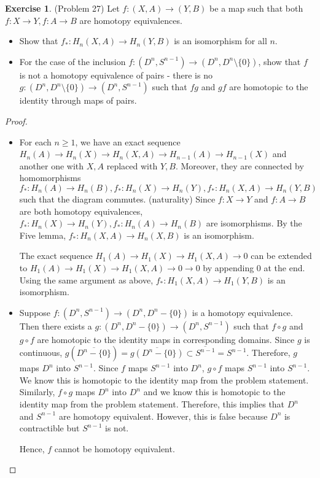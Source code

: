 \documentclass[12pt, psamsfonts]{amsart}
\theoremstyle{definition}
\newtheorem*{exer}{Exercise}
\theoremstyle{remark}
\numberwithin{equation}{section}
\begin{document}
\begin{exer}{(Problem 27)}
  Let $f:(X, A) \rightarrow (Y, B)$ be a map such that both $f: X \rightarrow Y, f:A \rightarrow B$ are homotopy equivalences.

  \begin{itemize}
    \item
      Show that $f_* : H_n(X, A) \rightarrow  H_n(Y, B)$ is an isomorphism for all $n$.
    \item
      For the case of the inclusion $f:(D^n, S^{n - 1}) \rightarrow (D^n, D^n \setminus \{ 0 \})$, show that $f$ is not a homotopy equivalence of pairs -
      there is no $g: (D^n, D^n \setminus \{ 0 \}) \rightarrow (D^n, S^{n - 1})$ such that $fg$ and $gf$ are homotopic to the identity through maps of pairs.
  \end{itemize}
\end{exer}

\begin{proof}
  $ $
  \begin{itemize}
    \item
      For each $n \geq 1$, we have an exact sequence $H_n(A) \rightarrow H_n(X) \rightarrow H_n(X, A) \rightarrow H_{n - 1}(A) \rightarrow H_{n - 1}(X)$ and another one with $X, A$ replaced with $Y, B$.
      Moreover, they are connected by homomorphisms $f_*: H_n(A) \rightarrow H_n(B), f_*: H_n(X) \rightarrow H_n(Y), f_*:H_n(X, A) \rightarrow H_n(Y, B)$ such that the diagram commutes. (naturality)
      Since $f: X \rightarrow Y$ and $f: A \rightarrow B$ are both homotopy equivalences, $f_*: H_n(X) \rightarrow H_n(Y), f_*: H_n(A) \rightarrow H_n(B)$ are isomorphisms.
      By the Five lemma, $f_*: H_n(X, A) \rightarrow H_n(X, B)$ is an isomorphism.

      The exact sequence $H_1(A) \rightarrow H_1(X) \rightarrow H_1(X, A) \rightarrow 0$ can be extended to $H_1(A) \rightarrow H_1(X) \rightarrow H_1(X, A) \rightarrow 0 \rightarrow 0$ by appending 0 at the end.
      Using the same argument as above, $f_*: H_1(X, A) \rightarrow H_1(Y, B)$ is an isomorphism.
    \item
      Suppose $f: (D^n, S^{n - 1}) \rightarrow (D^n, D^n - \{ 0 \})$ is a homotopy equivalence.
      Then there exists a $g: (D^n, D^n - \{ 0 \}) \rightarrow (D^n, S^{n - 1})$ such that $f \circ g$ and $g \circ f$ are homotopic to the identity maps in corresponding domains.
      Since $g$ is continuous, $g(\overline{D^n - \{ 0 \}}) = \overline{g(D^n - \{ 0 \})} \subset \overline{S^{n - 1}} = S^{n - 1}$.
      Therefore, $g$ maps $D^n$ into $S^{n - 1}$.
      Since $f$ maps $S^{n - 1}$ into $D^n$, $g \circ f$ maps $S^{n - 1}$ into $S^{n - 1}$.
      We know this is homotopic to the identity map from the problem statement.
      Similarly, $f \circ g$ maps $D^n$ into $D^n$ and we know this is homotopic to the identity map from the problem statement.
      Therefore, this implies that $D^n$ and $S^{n - 1}$ are homotopy equivalent.
      However, this is false because $D^n$ is contractible but $S^{n - 1}$ is not.

      Hence, $f$ cannot be homotopy equivalent.
  \end{itemize}

\end{proof}
\end{document}
